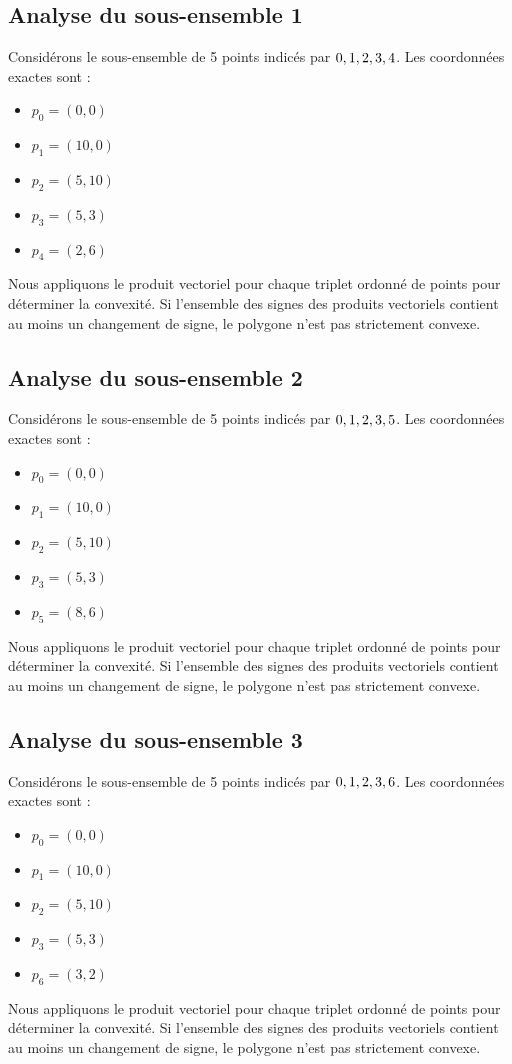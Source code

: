 \documentclass[11pt]{article}
\begin{document}
\subsection{Analyse du sous-ensemble 1}
Considérons le sous-ensemble de 5 points indicés par $\\{ 0, 1, 2, 3, 4 \\}$.
Les coordonnées exactes sont :
\begin{itemize}
\item $p_0 = (0, 0)$
\item $p_1 = (10, 0)$
\item $p_2 = (5, 10)$
\item $p_3 = (5, 3)$
\item $p_4 = (2, 6)$
\end{itemize}
Nous appliquons le produit vectoriel pour chaque triplet ordonné de points pour déterminer la convexité. Si l'ensemble des signes des produits vectoriels contient au moins un changement de signe, le polygone n'est pas strictement convexe.
\newpage

\subsection{Analyse du sous-ensemble 2}
Considérons le sous-ensemble de 5 points indicés par $\\{ 0, 1, 2, 3, 5 \\}$.
Les coordonnées exactes sont :
\begin{itemize}
\item $p_0 = (0, 0)$
\item $p_1 = (10, 0)$
\item $p_2 = (5, 10)$
\item $p_3 = (5, 3)$
\item $p_5 = (8, 6)$
\end{itemize}
Nous appliquons le produit vectoriel pour chaque triplet ordonné de points pour déterminer la convexité. Si l'ensemble des signes des produits vectoriels contient au moins un changement de signe, le polygone n'est pas strictement convexe.
\newpage

\subsection{Analyse du sous-ensemble 3}
Considérons le sous-ensemble de 5 points indicés par $\\{ 0, 1, 2, 3, 6 \\}$.
Les coordonnées exactes sont :
\begin{itemize}
\item $p_0 = (0, 0)$
\item $p_1 = (10, 0)$
\item $p_2 = (5, 10)$
\item $p_3 = (5, 3)$
\item $p_6 = (3, 2)$
\end{itemize}
Nous appliquons le produit vectoriel pour chaque triplet ordonné de points pour déterminer la convexité. Si l'ensemble des signes des produits vectoriels contient au moins un changement de signe, le polygone n'est pas strictement convexe.
\newpage
\end{document}
